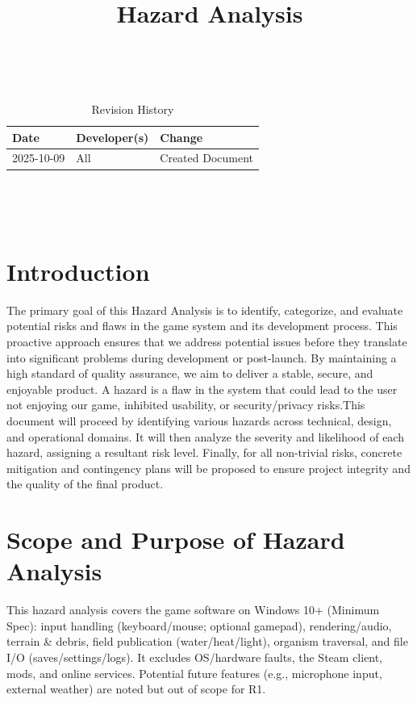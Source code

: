 \documentclass{article}
\title{Hazard Analysis\\\progname}
\author{\authname}
\date{}
\begin{document}
\maketitle
\thispagestyle{empty}

~\newpage


\begin{table}[hp]
\caption{Revision History} \label{TblRevisionHistory}
\begin{tabularx}{\textwidth}{llX}
\toprule
\textbf{Date} & \textbf{Developer(s)} & \textbf{Change}\\
\midrule
2025-10-09 & All & Created Document\\
\bottomrule
\end{tabularx}
\end{table}

~\newpage

\tableofcontents

~\newpage


\section{Introduction}

The primary goal of this Hazard Analysis is to identify, categorize, and evaluate potential risks and flaws in the game system and its development process. This proactive approach ensures that we address potential issues before they translate into significant problems during development or post-launch. By maintaining a high standard of quality assurance, we aim to deliver a stable, secure, and enjoyable product. A hazard is a flaw in the system that could lead to the user not enjoying our game, inhibited usability, or security/privacy risks.This document will proceed by identifying various hazards across technical, design, and operational domains. It will then analyze the severity and likelihood of each hazard, assigning a resultant risk level. Finally, for all non-trivial risks, concrete mitigation and contingency plans will be proposed to ensure project integrity and the quality of the final product.\\


\section{Scope and Purpose of Hazard Analysis}

This hazard analysis covers the game software on Windows 10+ (Minimum Spec): input handling (keyboard/mouse; optional gamepad), rendering/audio, terrain \& debris, field publication (water/heat/light), organism traversal, and file I/O (saves/settings/logs). It excludes OS/hardware faults, the Steam client, mods, and online services. Potential future features (e.g., microphone input, external weather) are noted but out of scope for R1.\\
\end{document}
